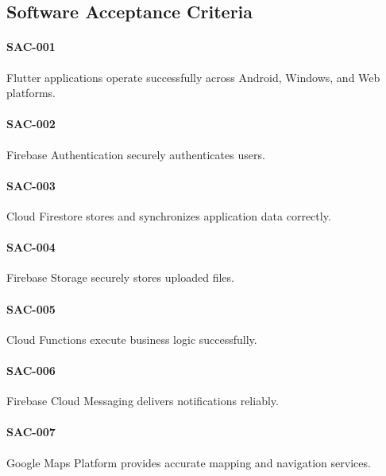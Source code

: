 
\subsection*{Software Acceptance Criteria}

\paragraph{SAC-001}

Flutter applications operate successfully across Android, Windows, and
Web platforms.

\paragraph{SAC-002}

Firebase Authentication securely authenticates users.

\paragraph{SAC-003}

Cloud Firestore stores and synchronizes application data correctly.

\paragraph{SAC-004}

Firebase Storage securely stores uploaded files.

\paragraph{SAC-005}

Cloud Functions execute business logic successfully.

\paragraph{SAC-006}

Firebase Cloud Messaging delivers notifications reliably.

\paragraph{SAC-007}

Google Maps Platform provides accurate mapping and navigation services.

